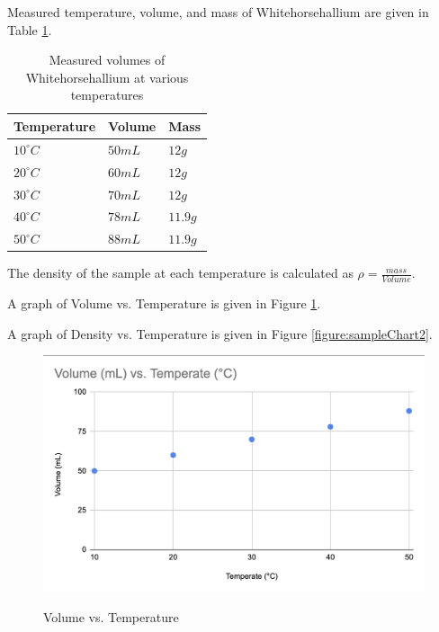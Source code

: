 \documentclass[11pt, oneside]{article}   	%
\newcommand{\chemname}{Whitehorsehallium }
\begin{document}
Measured temperature, volume, and mass of \chemname are given in Table \ref{table:sampleTable}.

\begin{table}[p]
\centering
\caption{Measured volumes of \chemname at various temperatures}
\begin{tabular}[b]{l | l| l}
\hline
Temperature & Volume & Mass \\
\hline
$10^{\circ} C$ & $50mL$   & $12 g$ \\
$20^{\circ} C$ & $60mL$   & $12 g$ \\
$30^{\circ} C$ & $70mL$   & $12 g$ \\
$40^{\circ} C$ & $78mL$   & $11.9 g$ \\
$50^{\circ} C$ & $88mL$   & $11.9 g$ \\
\end{tabular}
\label{table:sampleTable}
\end{table}

The density of the sample at each temperature is calculated as $\rho = \frac{mass}{Volume}$.

A graph of Volume vs. Temperature is given in Figure \ref{figure:sampleChart1}.

A graph of Density vs. Temperature is given in Figure \ref{figure:sampleChart2}.

\begin{figure}[p]
\centering
\caption{Volume vs. Temperature}
\includegraphics[scale=0.5]{Sample_Lab_Chart_1.png}
 \label{figure:sampleChart1}
 \end{figure}  
\end{document}
